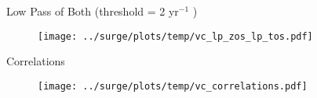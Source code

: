 \begin{frame}{Low Pass of Both (threshold = 2 yr$^{-1}$ )}
\vspace{-20pt}
\begin{figure}
\texttt{[image: ../surge/plots/temp/vc\_lp\_zos\_lp\_tos.pdf]}
\caption{}
\end{figure}
\end{frame}


\begin{frame}{Correlations}
\vspace{-20pt}
\begin{figure}
\texttt{[image: ../surge/plots/temp/vc\_correlations.pdf]}
\caption{}
\end{figure}
\end{frame}
